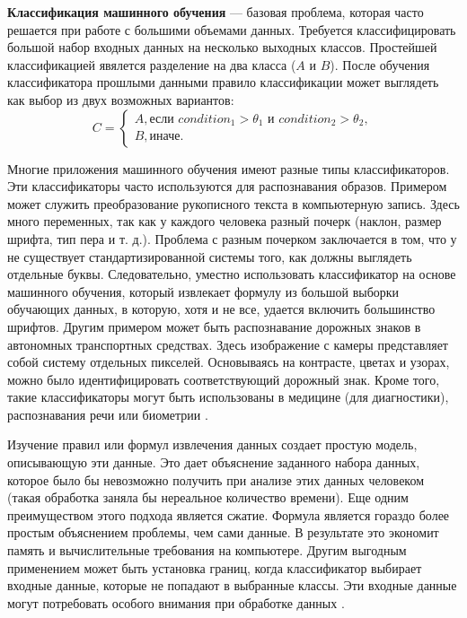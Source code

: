 \textbf{Классификация машинного обучения} --- базовая проблема, которая часто решается при работе с большими объемами данных. Требуется классифицировать большой набор входных данных на несколько выходных классов. Простейшей классификацией явялется разделение на два класса ($A$ и $B$). После обучения классификатора прошлыми данными правило классификации может выглядеть как выбор из двух возможных вариантов:
\begin{equation}
	C = \begin{cases}
		A, \text{если } condition_{1} > \theta_{1} \text{ и } condition_{2} > \theta_{2}, \\
		B, \text{иначе}.
	\end{cases}
\end{equation}


Многие приложения машинного обучения имеют разные типы классификаторов. Эти классификаторы часто используются для распознавания образов. Примером может служить преобразование рукописного текста в компьютерную запись. Здесь много переменных, так как у каждого человека разный почерк (наклон, размер шрифта, тип пера и т. д.). Проблема с разным почерком заключается в том, что у не существует стандартизированной системы того, как должны выглядеть отдельные буквы. Следовательно, уместно использовать классификатор на основе машинного обучения, который извлекает формулу из большой выборки обучающих данных, в которую, хотя и не все, удается включить большинство шрифтов. Другим примером может быть распознавание дорожных знаков в автономных транспортных средствах. Здесь изображение с камеры представляет собой систему отдельных пикселей. Основываясь на контрасте, цветах и   узорах, можно было идентифицировать соответствующий дорожный знак. Кроме того, такие классификаторы могут быть использованы в медицине (для диагностики), распознавания речи или биометрии \cite{introdmachlearn}.

Изучение правил или формул извлечения данных создает простую модель, описывающую эти данные. Это дает объяснение заданного набора данных, которое было бы невозможно получить при анализе этих данных человеком (такая обработка заняла бы нереальное количество времени). Еще одним преимуществом этого подхода является сжатие. Формула является гораздо более простым объяснением проблемы, чем сами данные. В результате это экономит память и вычислительные требования на компьютере. Другим выгодным применением может быть установка границ, когда классификатор выбирает входные данные, которые не попадают в выбранные классы. Эти входные данные могут потребовать особого внимания при обработке данных \cite{introdmachlearn}.

